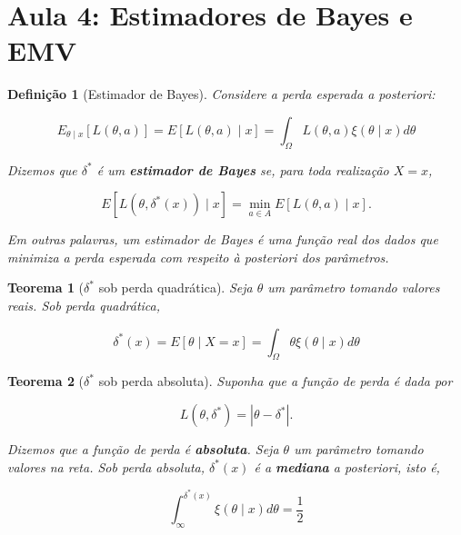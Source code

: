 \documentclass{article}
\newtheorem{theorem}{Teorema}
\newtheorem{definition}{Definição}
\begin{document}
	\section*{Aula 4: Estimadores de Bayes e EMV}
	\label{s4}
	\begin{definition}[Estimador de Bayes]
		Considere a perda esperada a posteriori:
		
		\begin{equation}
			E_{\theta \mid x} [L(\theta, a)] = E[L(\theta, a) \mid x] = \int_\Omega L(\theta, a) \xi (\theta \mid x) d \theta
		\end{equation}
		
		Dizemos que $\delta^*$ é um \textbf{estimador de Bayes} se, para toda realização $X = x$,
		
		\begin{equation}
			E[L(\theta, \delta^*(x)) \mid x] = \min_{a \in A} E[L(\theta, a) \mid x].
		\end{equation}
		
		Em outras palavras, um estimador de Bayes é uma função real dos dados que minimiza a perda esperada com respeito à posteriori dos parâmetros.
	\end{definition}
	
	\begin{theorem}[$\delta^*$ sob perda quadrática]
		Seja $\theta$ um parâmetro tomando valores reais. Sob perda quadrática,
		
		\begin{equation}
			\delta^*(x) = E[\theta \mid X = x] = \int_\Omega \theta \xi(\theta \mid x) d \theta
		\end{equation}
	\end{theorem}
	
	\begin{theorem}[$\delta^*$ sob perda absoluta]
		Suponha que a função de perda é dada por
		
		\begin{equation}
			L(\theta, \delta^*) = | \theta - \delta^*|.
		\end{equation}
		
		Dizemos que a função de perda é \textbf{absoluta}.
		Seja $\theta$ um parâmetro tomando valores na reta. Sob perda absoluta, $\delta^*(x)$ é a \textbf{mediana} a posteriori, isto é,
		
		\begin{equation}
			\int_{\infty}^{\delta^*(x)} \xi(\theta \mid x) d \theta = \frac{1}{2}
		\end{equation}
	\end{theorem}
	
\end{document}
